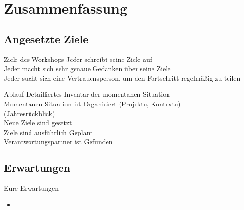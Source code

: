 \section{Zusammenfassung}

\subsection{Angesetzte Ziele}

\begin{frame}[c]{Ziele des Workshops}
    \Large
     \cmb Jeder schreibt seine Ziele auf \\
     \cmb Jeder macht sich sehr genaue Gedanken über seine Ziele \\
     \cmb Jeder sucht sich eine Vertrauensperson, um den Fortschritt regelmäßig zu teilen \\
\end{frame}


\begin{frame}[c]{Ablauf}
    \large
     \cmb Detailliertes Inventar der momentanen Situation \\
     \cmb Momentanen Situation ist Organisiert (Projekte, Kontexte) \\
     \cmb (Jahresrückblick) \\
     \cmb Neue Ziele sind gesetzt \\
     \cmb Ziele sind ausführlich Geplant \\
     \cmb Verantwortungspartner ist Gefunden \\
\end{frame}


\subsection{Erwartungen}

\begin{frame}[c]{Eure Erwartungen}
    \begin{itemize}[<+(1)->]
        \item {}
    \end{itemize}
\end{frame}


